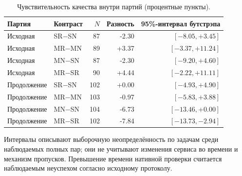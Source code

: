 \begin{table}[!htbp]\centering\scriptsize
\caption{Чувствительность качества внутри партий (процентные пункты).}\label{tab:heldout-sensitivity-batch}
\begin{tabular*}{\textwidth}{@{\extracolsep{\fill}}llrrr}\toprule
Партия & Контраст & $N$ & Разность & 95\%-интервал бутстрэпа \\ \midrule
Исходная & SR$-$SN & 87 & -2.30 & $[-8.05,+3.45]$ \\
Исходная & MR$-$MN & 89 & +3.37 & $[-3.37,+11.24]$ \\
Исходная & MN$-$SN & 87 & -2.30 & $[-9.20,+4.60]$ \\
Исходная & MR$-$SR & 90 & +4.44 & $[-2.22,+11.11]$ \\
Продолжение & SR$-$SN & 102 & +0.00 & $[-4.93,+4.90]$ \\
Продолжение & MR$-$MN & 103 & -0.97 & $[-5.83,+3.88]$ \\
Продолжение & MN$-$SN & 104 & -6.73 & $[-13.46,+0.00]$ \\
Продолжение & MR$-$SR & 102 & -7.84 & $[-13.73,-2.94]$ \\
\bottomrule\end{tabular*}\par\smallskip\footnotesize Интервалы описывают выборочную неопределённость по задачам среди наблюдаемых полных пар; они не учитывают изменения сервиса во времени и механизм пропусков. Превышение времени нативной проверки считается наблюдаемым неуспехом согласно исходному протоколу.\end{table}
